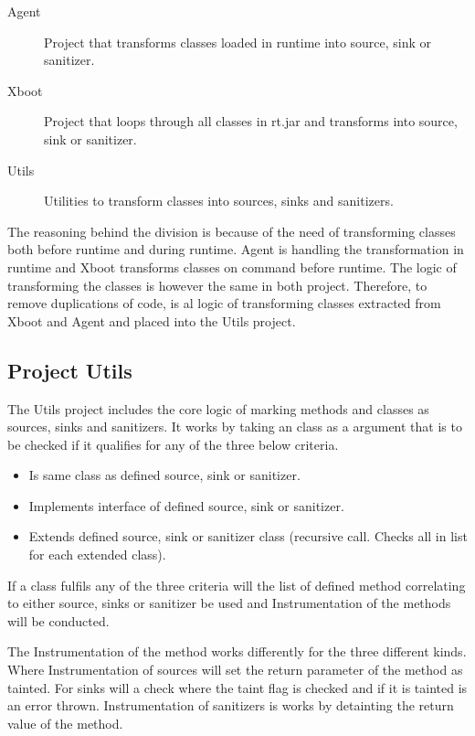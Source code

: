 \hfill
\begin{description}
	\item[Agent] Project that transforms classes loaded in runtime into source, sink or sanitizer.
	\item[Xboot] Project that loops through all classes in rt.jar and transforms into source, sink or sanitizer.
	\item[Utils] Utilities to transform classes into sources, sinks and sanitizers. 
\end{description}
\hfill

The reasoning behind the division is because of the need of transforming classes both before runtime and during runtime. Agent is handling the transformation in runtime and Xboot transforms classes on command before runtime. The logic of transforming the classes is however the same in both project. Therefore, to remove duplications of code, is al logic of transforming classes extracted from Xboot and Agent and placed into the Utils project.


\subsection{Project Utils}
The Utils project includes the core logic of marking methods and classes as sources, sinks and sanitizers. It works by taking an class as a argument that is to be checked if it qualifies for any of the three below criteria.

\hfill
\begin{itemize}
	\item Is same class as defined source, sink or sanitizer.
	\item Implements interface of defined source, sink or sanitizer.
	\item Extends defined source, sink or sanitizer class (recursive call. Checks all in list for each extended class). 
\end{itemize}
\hfill

If a class fulfils any of the three criteria will the list of defined method correlating to either source, sinks or sanitizer be used and Instrumentation of the methods will be conducted.

The Instrumentation of the method works differently for the three different kinds. Where Instrumentation of sources will set the return parameter of the method as tainted. For sinks will a check where the taint flag is checked and if it is tainted is an error thrown. Instrumentation of sanitizers is works by detainting the return value of the method.


